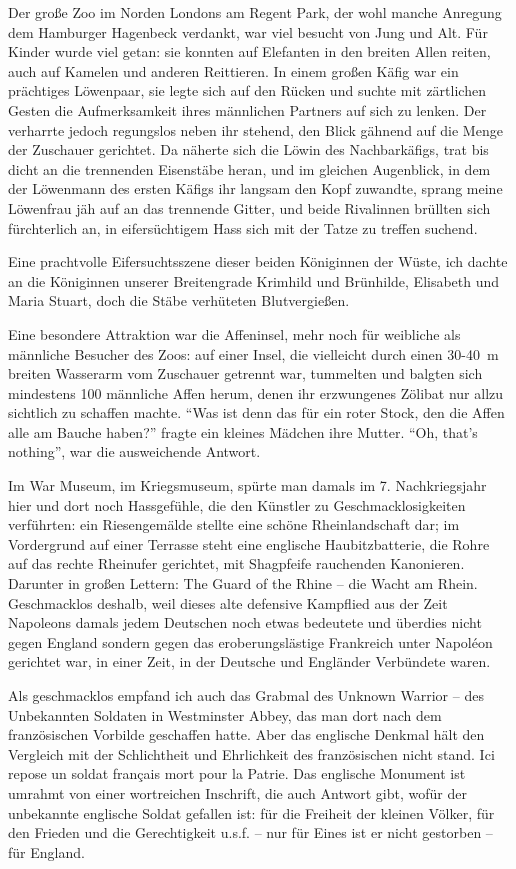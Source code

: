Der große Zoo im Norden Londons am Regent Park, der wohl manche Anregung dem Hamburger Hagenbeck verdankt, war viel besucht von Jung und Alt. Für Kinder wurde viel getan: sie konnten auf Elefanten in den breiten Allen reiten, auch auf Kamelen und anderen Reittieren. In einem großen Käfig war ein prächtiges Löwenpaar, sie legte sich auf den Rücken und suchte mit zärtlichen Gesten die Aufmerksamkeit ihres männlichen Partners auf sich zu lenken. Der verharrte jedoch regungslos neben ihr stehend, den Blick gähnend auf die Menge der Zuschauer gerichtet. Da näherte sich die Löwin des Nachbarkäfigs, trat bis dicht an die trennenden Eisenstäbe heran, und im gleichen Augenblick, in dem der Löwenmann des ersten Käfigs ihr langsam den Kopf zuwandte, sprang meine Löwenfrau jäh auf an das trennende Gitter, und beide Rivalinnen brüllten sich fürchterlich an, in eifersüchtigem Hass sich mit der Tatze zu treffen suchend.

Eine prachtvolle Eifersuchtsszene dieser beiden Königinnen der Wüste, ich dachte an die Königinnen unserer Breitengrade Krimhild und Brünhilde, Elisabeth und Maria Stuart, doch die Stäbe verhüteten Blutvergießen.

Eine besondere Attraktion war die Affeninsel, mehr noch für weibliche als männliche Besucher des Zoos: auf einer Insel, die vielleicht durch einen 30-40~m breiten Wasserarm vom Zuschauer getrennt war, tummelten und balgten sich mindestens 100 männliche Affen herum, denen ihr erzwungenes Zölibat nur allzu sichtlich zu schaffen machte. \enquote{Was ist denn das für ein roter Stock, den die Affen alle am Bauche haben?} fragte ein kleines Mädchen ihre Mutter. \enquote{Oh, that's nothing}, war die ausweichende Antwort.

Im War Museum, im Kriegsmuseum, spürte man damals im 7. Nachkriegsjahr hier und dort noch Hassgefühle, die den Künstler zu Geschmacklosigkeiten verführten: ein Riesengemälde stellte eine schöne Rheinlandschaft dar; im Vordergrund auf einer Terrasse steht eine englische Haubitzbatterie, die Rohre auf das rechte Rheinufer gerichtet, mit Shagpfeife rauchenden Kanonieren. Darunter in großen Lettern: The Guard of the Rhine -- die Wacht am Rhein. Geschmacklos deshalb, weil dieses alte defensive Kampflied aus der Zeit Napoleons damals jedem Deutschen noch etwas bedeutete und überdies nicht gegen England sondern gegen das eroberungslästige Frankreich unter Napoléon gerichtet war, in einer Zeit, in der Deutsche und Engländer Verbündete waren.

Als geschmacklos empfand ich auch das Grabmal des Unknown Warrior -- des Unbekannten Soldaten in Westminster Abbey, das man dort nach dem französischen Vorbilde geschaffen hatte. Aber das englische Denkmal hält den Vergleich mit der Schlichtheit und Ehrlichkeit des französischen nicht stand. Ici repose un soldat français mort pour la Patrie. Das englische Monument ist umrahmt von einer wortreichen Inschrift, die auch Antwort gibt, wofür der unbekannte englische Soldat gefallen ist: für die Freiheit der kleinen Völker, für den Frieden und die Gerechtigkeit u.s.f. -- nur für Eines ist er nicht gestorben -- für England.

